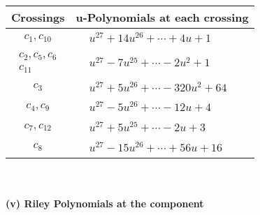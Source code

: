 \documentclass[1p]{elsarticle_modified}
\theoremstyle{definition}
\begin{document}
\begin{tabular}{m{50pt}|m{274pt}}
Crossings & \hspace{64pt}u-Polynomials at each crossing \\
\hline $$\begin{aligned}c_{1},c_{10}\end{aligned}$$&$\begin{aligned}
&u^{27}+14 u^{26}+\cdots+4 u+1
\end{aligned}$\\
\hline $$\begin{aligned}c_{2},c_{5},c_{6}\\c_{11}\end{aligned}$$&$\begin{aligned}
&u^{27}-7 u^{25}+\cdots-2 u^2+1
\end{aligned}$\\
\hline $$\begin{aligned}c_{3}\end{aligned}$$&$\begin{aligned}
&u^{27}+5 u^{26}+\cdots-320 u^2+64
\end{aligned}$\\
\hline $$\begin{aligned}c_{4},c_{9}\end{aligned}$$&$\begin{aligned}
&u^{27}-5 u^{26}+\cdots-12 u+4
\end{aligned}$\\
\hline $$\begin{aligned}c_{7},c_{12}\end{aligned}$$&$\begin{aligned}
&u^{27}+5 u^{25}+\cdots-2 u+3
\end{aligned}$\\
\hline $$\begin{aligned}c_{8}\end{aligned}$$&$\begin{aligned}
&u^{27}-15 u^{26}+\cdots+56 u+16
\end{aligned}$\\
\hline
\end{tabular}\\~\\
\newpage\renewcommand{\arraystretch}{1}
\flushleft \textbf{(v) Riley Polynomials at the component}\newline \\
\end{document}
